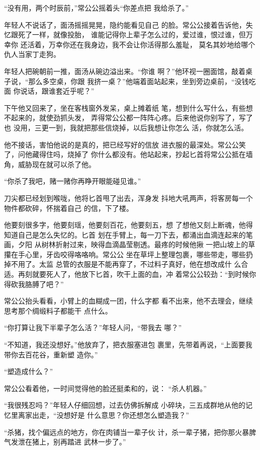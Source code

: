 “没有用，两个时辰前，”常公公摇着头“你差点把
我给杀了。”

年轻人不说话了，面汤摇摇晃晃，隐约能看见自己
的脸。常公公接着告诉他，失忆跟死了一样，就像投胎，
谁能记得你上辈子怎么过的，爱过谁，恨过谁，但万幸你
还活着，万幸你还在我身边，我不会让你活得那么羞耻，
莫名其妙地给哪个仇人当家丁走狗。

年轻人把碗朝前一推，面汤从碗边溢出来。“你谁
啊？”他环视一圈面馆，敲着桌子说，“那么多空桌，你跟
我挤一桌？”他端着面站起来，坐到旁边桌前，“没钱吃面
你说话，跟谁套近乎呢？”
\newline

下午他又回来了，坐在客栈窗外发呆，桌上摊着纸
笔，想到什么写什么，有些想不起来的，就使劲抓头发，
弄得常公公都一阵阵心疼。后来他说你别写了，写了也
没用，三更一到，我就把那些信烧掉，以后我想让你怎么
活，你就怎么活。

他不接话，害怕他说的是真的，把已经写好的信放
进衣服的最深处。常公公笑了，问他藏得住吗，烧掉了
你什么都没有。他站起来，抄起匕首将常公公抵在墙
角，威胁现在就可以杀了他。

“你杀了我吧，赌一赌你再睁开眼能碰见谁。”

刀尖都已经划到喉咙，他将匕首甩了出去，浑身发
抖地大吼两声，将客房每一个物件都砍碎，怀揣着自己
的信，下了楼。
\newline

他要刻很多字，他要刻瑶，他要刻百花，他要刻五，想
了想他又刻上断魂，他得知道自己是怎么失忆的。匕首
划在手臂上，每一刀下去，都涌出血滴连起来的笔画，夕阳
从树林折射过来，映得血滴晶莹剔透。最疼的时候他揪
一把山坡上的草攥在手心里，牙齿咬得咯咯响。常公公
坐在草坪上整理包裹，哪些带走，哪些扔掉不用了。太监
总管的衣服是不能再穿了，不过料子真好，他在想改成什
么合适。再刻就要死人了，他放下匕首，吹干上面的血，冲
着常公公较劲：“到时候你得砍我胳膊了吧？”

常公公抬头看看，小臂上的血糊成一团，什么字都
看不出来，他不去理会，继续思考那个绸缎料子都能干
点什么。

“你打算让我下半辈子怎么活？”年轻人问，“带我去
哪？”

“不知道，我还没想好。”他放弃了，把衣服塞进包
裹里，先带着再说，“上面要我带你去百花谷，重新塑
造你。”

“塑造成什么？”

常公公看着他，一时间觉得他的脸还挺柔和的，说：
“杀人机器。”

“我很残忍吗？”年轻人仔细回想，过去仿佛拆解成
小碎块，三五成群地从他的记忆里离家出走，“没想好是
什么意思？你还想怎么塑造我？”

“杀猪，找个偏远点的地方，你在肉铺当一辈子伙
计，杀一辈子猪，把你那火暴脾气发泄在猪上，别再踏进
武林一步了。”

